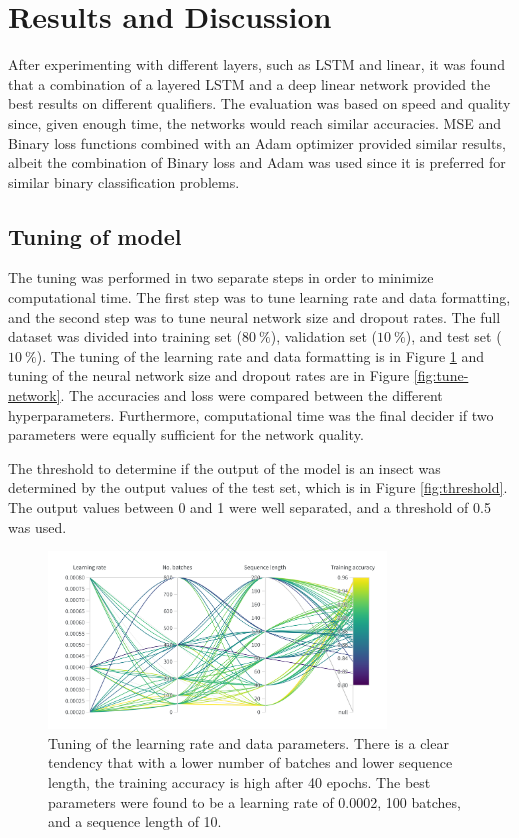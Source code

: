 \section{Results and Discussion}
After experimenting with different layers, such as LSTM and linear, it was found that a combination of a layered LSTM and a deep linear network provided the best results on different qualifiers. The evaluation was based on speed and quality since, given enough time, the networks would reach similar accuracies. MSE and Binary loss functions combined with an Adam optimizer provided similar results, albeit the combination of Binary loss and Adam was used since it is preferred for similar binary classification problems\cite{https://doi.org/10.1002/for.2585}. 


\subsection{Tuning of model}

The tuning was performed in two separate steps in order to minimize computational time. The first step was to tune learning rate and data formatting, and the second step was to tune neural network size and dropout rates. The full dataset was divided into training set ($80 \:  \%$), validation set ($10 \:  \%$), and test set ($10 \:  \%$).
The tuning of the learning rate and data formatting is in Figure \ref{fig:tune-data} and tuning of the neural network size and dropout rates are in Figure \ref{fig:tune-network}. The accuracies and loss were compared between the different hyperparameters. Furthermore, computational time was the final decider if two parameters were equally sufficient for the network quality. 

The threshold to determine if the output of the model is an insect was determined by the output values of the test set, which is in Figure \ref{fig:threshold}. The output values between 0 and 1 were well separated, and a threshold of 0.5 was used. 


\begin{figure}[htb]
  \centering
  \includegraphics[width=0.8\textwidth]{Figures/data_tuning}
  \caption{Tuning of the learning rate and data parameters. There is a clear tendency that with a lower number of batches and lower sequence length, the training accuracy is high after 40 epochs. The best parameters were found to be a learning rate of 0.0002, 100 batches, and a sequence length of 10.}
  \label{fig:tune-data}
\end{figure}

